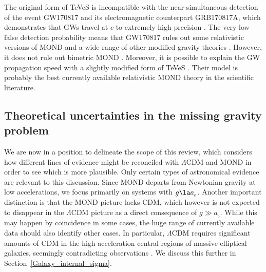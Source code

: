 \documentclass[fleqn,usenatbib,useAMS]{mnras} %
\begin{document}
The original form of TeVeS is incompatible with the near-simultaneous detection of the event GW170817 and its electromagnetic counterpart GRB170817A, which demonstrates that GWs travel at $c$ to extremely high precision \citep{LIGO_Virgo_2017}. The very low false detection probability means that GW170817 rules out some relativistic versions of MOND \citep{Boran_2018} and a wide range of other modified gravity theories \citep{Amendola_2018, Battye_2018, Copeland_2019}. However, it does not rule out bimetric MOND \citep{Milgrom_2009_bimetric}. Moreover, it is possible to explain the GW propagation speed with a slightly modified form of TeVeS \citep{Skordis_2019}. Their model is probably the best currently available relativistic MOND theory in the scientific literature.



\subsection{Theoretical uncertainties in the missing gravity problem}
\label{Theoretical_uncertainties}

We are now in a position to delineate the scope of this review, which considers how different lines of evidence might be reconciled with $\Lambda$CDM and MOND in order to see which is more plausible. Only certain types of astronomical evidence are relevant to this discussion. Since MOND departs from Newtonian gravity at low accelerations, we focus primarily on systems with $g \la a_{_0}$. Another important distinction is that the MOND picture lacks CDM, which however is not expected to disappear in the $\Lambda$CDM picture as a direct consequence of $g \gg a_{_0}$. While this may happen by coincidence in some cases, the huge range of currently available data should also identify other cases. In particular, $\Lambda$CDM requires significant amounts of CDM in the high-acceleration central regions of massive elliptical galaxies, seemingly contradicting observations \citep{Tian_2019}. We discuss this further in Section~\ref{Galaxy_internal_sigma}.
\end{document}
